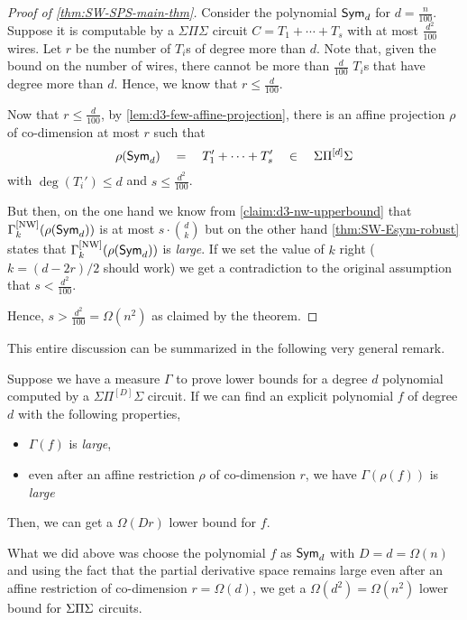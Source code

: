 \begin{proof}[Proof of \autoref{thm:SW-SPS-main-thm}]
Consider the polynomial $\operatorname{\mathsf{Sym}}_d$ for $d = \frac{n}{100}$. Suppose it is computable by a $\Sigma\Pi\Sigma$ circuit $C = T_1 + \cdots + T_s$ with at most $\frac{d^2}{100}$ wires. Let $r$ be the number of $T_i$s of degree more than $d$. Note that, given the bound on the number of wires, there cannot be more than $\frac{d}{100}$ $T_i$s that have degree more than $d$. Hence, we know that $r \leq \frac{d}{100}$. 

Now that $r \leq \frac{d}{100}$, by \autoref{lem:d3-few-affine-projection}, there is an affine projection $\rho$ of co-dimension at most $r$ such that 
\[
\rho(\operatorname{\mathsf{Sym}}_d) \quad = \quad T_1' + \cdots + T_s' \quad \in \quad \Sigma\Pi^{[d]}\Sigma
\]
with $\deg(T_i') \leq d$ and $s \leq \frac{d^2}{100}$. 

But then, on the one hand we know from \autoref{claim:d3-nw-upperbound} that $\Gamma^{\mathrm{[NW]}}_k(\rho(\operatorname{\mathsf{Sym}}_d))$ is at most $s \cdot \binom{d}{k}$ but on the other hand \autoref{thm:SW-Esym-robust} states that $\Gamma^{\mathrm{[NW]}}_k(\rho(\operatorname{\mathsf{Sym}}_d))$ is \emph{large}. If we set the value of $k$ right ($k=(d-2r)/2$ should work) we get a contradiction to the original assumption that $s < \frac{d^2}{100}$. 

Hence, $s > \frac{d^2}{100} = \Omega(n^2)$ as claimed by the theorem. 
\end{proof}

This entire discussion can be summarized in the following very general remark.

\begin{mdframed}
\begin{remark}\label{rem:meta-SW-lb}
  Suppose we have a measure $\Gamma$ to prove lower bounds for a degree $d$ polynomial computed by a $\Sigma\Pi^{[D]}\Sigma$ circuit. If we can find an explicit polynomial $f$ of degree $d$ with the following properties,
  \begin{itemize}
  \item $\Gamma(f)$ is \emph{large},
  \item even after an affine restriction $\rho$ of co-dimension $r$, we have $\Gamma(\rho(f))$ is \emph{large}
  \end{itemize}
  Then, we can get a $\Omega(Dr)$ lower bound for $f$. 
\end{remark}
\end{mdframed}
What we did above was choose the polynomial $f$ as $\operatorname{\mathsf{Sym}}_d$ with $D = d = \Omega(n)$ and using the fact that the partial derivative space remains large even after an affine restriction of co-dimension $r = \Omega(d)$, we get a $\Omega(d^2) = \Omega(n^2)$ lower bound for $\Sigma\Pi\Sigma$ circuits.

